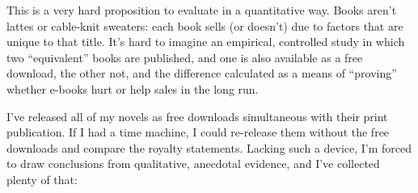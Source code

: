 This is a very hard proposition to evaluate in a quantitative way.
Books aren't lattes or cable-knit sweaters: each book sells (or
doesn't) due to factors that are unique to that title. It's hard to
imagine an empirical, controlled study in which two ``equivalent''
books are published, and one is also available as a free download,
the other not, and the difference calculated as a means of
``proving'' whether e-books hurt or help sales in the long run.

I've released all of my novels as free downloads simultaneous with
their print publication. If I had a time machine, I could
re-release them without the free downloads and compare the royalty
statements. Lacking such a device, I'm forced to draw conclusions
from qualitative, anecdotal evidence, and I've collected plenty of
that:

